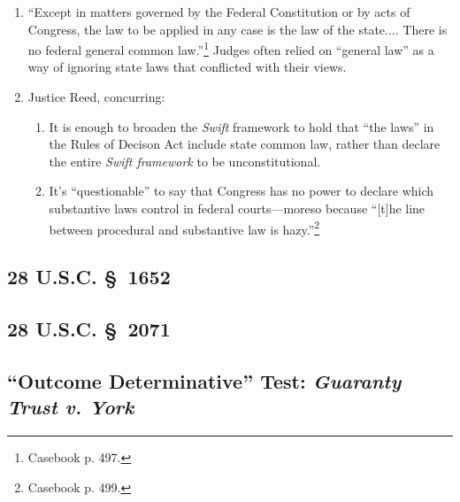 \begin{enumerate}
\begin{enumerate}
        discrimination by noncitizens against citizens.''\footnote{Casebook p. 
        496.}
        \item The federal government did not have the power to 
        legislate rules of tort or contract law.\footnote{This quickly became untrue 
        as the Court expanded the federal government's power to regulate these 
        areas under the Commerce Clause.} Federal courts also do not have the 
        power to create rules in these areas.
        \item Reversed and remanded to be decided on the basis of Pennsylvania 
        state law.
        \item The \emph{Swift} rule is overturned.
    \end{enumerate}
    \item ``Except in matters governed by the Federal Constitution or by acts 
    of Congress, the law to be applied in any case is the law of the state.... 
    There is no federal general common law.''\footnote{Casebook p. 497.} 
    Judges often relied on ``general law'' as a way of ignoring state laws that 
    conflicted with their views.
    \item Justice Reed, concurring:
    \begin{enumerate}
        \item It is enough to broaden the \emph{Swift} framework to hold that 
        ``the laws'' in the Rules of Decison Act include state common law, 
        rather than declare the entire \emph{Swift framework} to be 
        unconstitutional.
        \item It's ``questionable'' to say that Congress has no power to 
        declare which substantive laws control in federal courts---moreso 
        because ``[t]he line between procedural and substantive law is 
        hazy.''\footnote{Casebook p. 499.}
    \end{enumerate}
\end{enumerate}

\subsection{28 U.S.C. \S\ 1652} %

\subsection{28 U.S.C. \S\ 2071} %

\subsection{``Outcome Determinative'' Test: \emph{Guaranty Trust v. York}}


